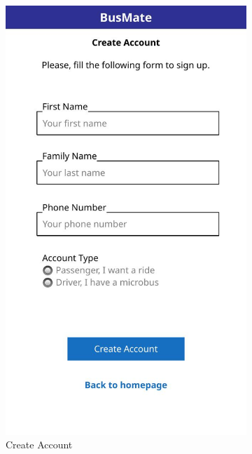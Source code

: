 \documentclass{BusMateSRS}
\begin{document}
\begin{figure}[h!]
\begin{subfigure}[b]{0.3\textwidth}
    \includegraphics[width=\textwidth]{images-ui/ui-out-2.jpg}
    \caption{Create Account}
    \label{fig:ui2}
  \end{subfigure}
  \hfill
  \begin{subfigure}[b]{0.3\textwidth}
    \centering

\end{subfigure}
\end{figure}
\end{document}
